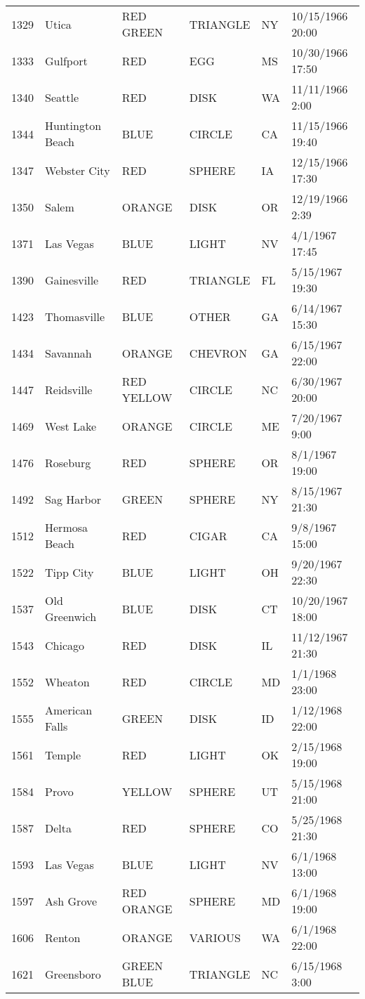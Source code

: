 \begin{tabular}{llllll}
1329 & Utica & RED GREEN & TRIANGLE & NY & 10/15/1966 20:00 \\
1333 & Gulfport & RED & EGG & MS & 10/30/1966 17:50 \\
1340 & Seattle & RED & DISK & WA & 11/11/1966 2:00 \\
1344 & Huntington Beach & BLUE & CIRCLE & CA & 11/15/1966 19:40 \\
1347 & Webster City & RED & SPHERE & IA & 12/15/1966 17:30 \\
1350 & Salem & ORANGE & DISK & OR & 12/19/1966 2:39 \\
1371 & Las Vegas & BLUE & LIGHT & NV & 4/1/1967 17:45 \\
1390 & Gainesville & RED & TRIANGLE & FL & 5/15/1967 19:30 \\
1423 & Thomasville & BLUE & OTHER & GA & 6/14/1967 15:30 \\
1434 & Savannah & ORANGE & CHEVRON & GA & 6/15/1967 22:00 \\
1447 & Reidsville & RED YELLOW & CIRCLE & NC & 6/30/1967 20:00 \\
1469 & West Lake & ORANGE & CIRCLE & ME & 7/20/1967 9:00 \\
1476 & Roseburg & RED & SPHERE & OR & 8/1/1967 19:00 \\
1492 & Sag Harbor & GREEN & SPHERE & NY & 8/15/1967 21:30 \\
1512 & Hermosa Beach & RED & CIGAR & CA & 9/8/1967 15:00 \\
1522 & Tipp City & BLUE & LIGHT & OH & 9/20/1967 22:30 \\
1537 & Old Greenwich & BLUE & DISK & CT & 10/20/1967 18:00 \\
1543 & Chicago & RED & DISK & IL & 11/12/1967 21:30 \\
1552 & Wheaton & RED & CIRCLE & MD & 1/1/1968 23:00 \\
1555 & American Falls & GREEN & DISK & ID & 1/12/1968 22:00 \\
1561 & Temple & RED & LIGHT & OK & 2/15/1968 19:00 \\
1584 & Provo & YELLOW & SPHERE & UT & 5/15/1968 21:00 \\
1587 & Delta & RED & SPHERE & CO & 5/25/1968 21:30 \\
1593 & Las Vegas & BLUE & LIGHT & NV & 6/1/1968 13:00 \\
1597 & Ash Grove & RED ORANGE & SPHERE & MD & 6/1/1968 19:00 \\
1606 & Renton & ORANGE & VARIOUS & WA & 6/1/1968 22:00 \\
1621 & Greensboro & GREEN BLUE & TRIANGLE & NC & 6/15/1968 3:00 \\

\end{tabular}
